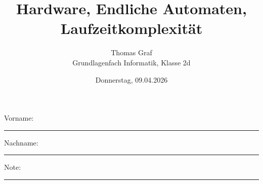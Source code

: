 \newtoggle{withbonus} \toggletrue{withbonus} %

\newcommand{\mycourse}{Grundlagenfach Informatik}
\newcommand{\myclass}{Klasse 2d}
\newcommand{\mydate}{Donnerstag, 09.04.2026}

\title{\textbf{Hardware, Endliche Automaten, Laufzeitkomplexität}}
\author{Thomas Graf\\
	\mycourse, \myclass}
\date{\mydate}
\maketitle
\thispagestyle{headandfoot}

\begin{center}
\end{center}
\vspace{10mm}

\begin{center}
	Vorname: \rule{45mm}{0.8pt}\qquad Nachname: \rule{45mm}{0.8pt}
\end{center}
\vspace{20mm}

\begin{center}
	\iftoggle{withbonus} {
		\combinedgradetable[h][questions]
	} {
		\gradetable[h][questions]
	}
\end{center}
\vspace{15mm}
\begin{center}
	Note:
	\vspace{10mm}

	\rule{8mm}{1.2pt}
\end{center}
\clearpage

